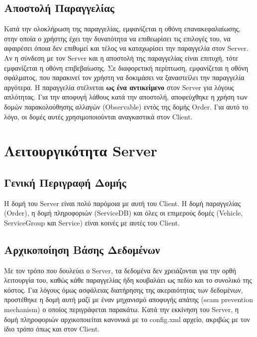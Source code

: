         \subsection{Αποστολή Παραγγελίας}
        \label{sec:SubSectionName2.1.7}
        Κατά την ολοκλήρωση της παραγγελίας, εμφανίζεται η οθόνη επανακεφαλαίωσης, στην οποία ο χρήστης έχει την δυνατότητα να επιθεωρίσει τις επιλογές του, να αφαιρέσει όποια δεν επιθυμεί και τέλος να καταχωρίσει την παραγγελία στον Server. Αν η σύνδεση με τον Server και η αποστολή της παραγγελίας είναι επιτυχή, τότε εμφανίζεται η οθόνη επιβεβαίωσης. Σε διαφορετική περίπτωση, εμφανίζεται η οθόνη σφάλματος, που παρακινεί τον χρήστη να δοκιμάσει να ξαναστείλει την παραγγελία αργότερα. 
        \newline
        \newline
        Η παραγγελία στέλνεται \textbf{ως ένα αντικείμενο} στον Server για λόγους απλότητας. Για την αποφυγή λάθους κατά την αποστολή, αποφεύχθηκε η χρήση των δομών παρακολούθησης αλλαγών (Observable) εντός της δομής Order. Για αυτό το λόγο, οι δομές αυτές χρησιμοποιούνται αναγκαστικά στον Client.

    \section{Λειτουργικότητα Server}
    \label{sec:SectionName2.2}

        \subsection{Γενική Περιγραφή Δομής}
        \label{sec:SubSectionName2.2.1}
        Η δομή του Server είναι πολύ παρόμοια με αυτή του Client. Η δομή παραγγελίας (Order), η δομή πληροφοριών (ServiceDB) και όλες οι επιμερούς δομές (Vehicle, ServiceGroup και Service) είναι κοινές με αυτές του Client.
        
        \subsection{Αρχικοποίηση Βάσης Δεδομένων}
        \label{sec:SubSectionName2.2.2}
        Με τον τρόπο που δουλεύει ο Server, τα δεδομένα δεν χρειάζονται για την ορθή λειτουργία του, καθώς κάθε παραγγελίας ήδη κουβαλάει ως πεδίο και το συνολικό της κόστος. Για λόγους όμως ασφάλειας διατήρησης της ακεραιότητας των δεδομένων, προστέθηκε η δομή αυτή μαζί με έναν μηχανισμό αποφυγής απάτης (scam prevention mechanism) ο οποίος περιγράφεται παρακάτω. Κατά την εκκίνηση του Server, η δομή πληροφοριών αρχικοποιείται κανονικά με το config.xml αρχείο, ακριβώς με τον ίδιο τρόπο όπως και στον Client.
        

